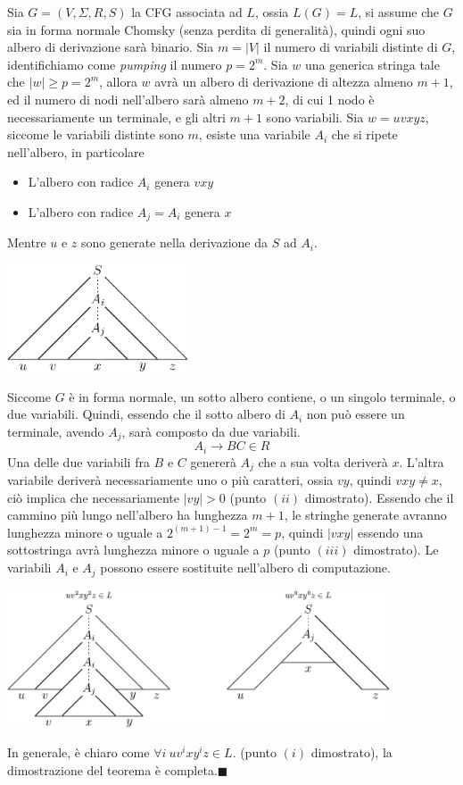 \documentclass[10pt, letterpaper]{report}
\begin{document}
 Sia $G=(V,\Sigma, R, S)$ la CFG associata ad $L$, ossia $L(G)=L$, si assume che $G$ sia in forma 
normale Chomsky (senza perdita di generalità), quindi ogni suo albero di derivazione sarà binario. Sia $m=|V|$ il numero 
di variabili distinte di $G$, identifichiamo come \textit{pumping} il numero $p=2^m$. Sia $w$ una generica stringa tale 
che $|w|\ge p = 2^m$, allora $w$ avrà un albero di derivazione di altezza almeno $m+1$, ed il numero di nodi 
nell'albero sarà almeno $m+2$, di cui 1 nodo è necessariamente un terminale, e gli altri $m+1$ sono variabili.\acc 
Sia $w=uvxyz$, siccome le variabili distinte sono $m$, esiste una variabile $A_i$ che si ripete nell'albero, in particolare \begin{itemize}
    \item L'albero con radice $A_i$ genera $vxy$
    \item L'albero con radice $A_j=A_i$ genera $x$
\end{itemize}
Mentre $u$ e $z$ sono generate nella derivazione da $S$ ad $A_i$.\begin{center}
    \includegraphics[width=0.4\textwidth ]{images/alberoDer1.eps}
\end{center}
Siccome $G$ è in forma normale, un sotto albero contiene, o un singolo terminale, o due variabili. Quindi, essendo che il 
sotto albero di $A_i$ non può essere un terminale, avendo $A_j$, sarà composto da due variabili. 
$$A_i\longrightarrow BC\in R $$
Una delle due variabili fra $B$ e $C$ genererà $A_j$ che a sua volta deriverà $x$. L'altra variabile deriverà necessariamente uno o più caratteri, ossia
$vy$, quindi $vxy\ne x$, ciò implica che necessariamente $|vy|>0$ (punto $(ii)$ dimostrato).\acc 
Essendo che il cammino più lungo nell'albero ha lunghezza $m+1$, le stringhe generate avranno lunghezza 
minore o uguale a $2^{(m+1)-1}=2^m=p$, quindi $|vxy|$ essendo una sottostringa avrà lunghezza minore o uguale a $ p$  (punto $(iii)$ dimostrato).\acc 
Le variabili $A_i$ e $A_j$ possono essere sostituite nell'albero di computazione.
\begin{center}
    \includegraphics[width=0.85\textwidth ]{images/alberoDer2.eps}
\end{center}
In generale, è chiaro come $\forall i \ uv^ixy^iz\in L$. (punto $(i)$ dimostrato), la dimostrazione del 
teorema è completa.\hfill$\blacksquare$
\end{document}
